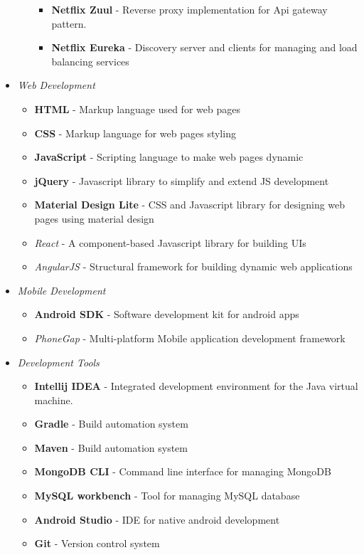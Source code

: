 \documentclass[12pt]{article}
\begin{document}
\begin{itemize}[leftmargin=20pt]
\begin{itemize}[leftmargin=20pt]
		\begin{itemize}
			\item \textbf{Netflix Zuul} - Reverse proxy implementation for Api gateway pattern.
			\item \textbf{Netflix Eureka} - Discovery server and clients for managing and load balancing services
		\end{itemize}
	\end{itemize}
	\item \textit{Web Development}
	\begin{itemize}
		\item \textbf{HTML} - Markup language used for web pages
		\item \textbf{CSS} - Markup language for web pages styling
		\item \textbf{JavaScript} - Scripting language to make web pages dynamic
		\item \textbf{jQuery} - Javascript library to simplify and extend JS development
		\item \textbf{Material Design Lite} - CSS and Javascript library for designing web pages using material design
		\item \textit{React} - A component-based Javascript library for building UIs
		\item \textit{AngularJS} - Structural framework for building dynamic web applications
		
	\end{itemize}

	\item \textit{Mobile Development}
	\begin{itemize}
		\item \textbf{Android SDK} - Software development kit for android apps
		\item \textit{PhoneGap} - Multi-platform Mobile application development framework
	\end{itemize}
	\item \textit{Development Tools}
	\begin{itemize}
		\item \textbf{Intellij IDEA} - Integrated development environment for the Java virtual machine.
		\item \textbf{Gradle} - Build automation system
		\item \textbf{Maven} - Build automation system
		\item \textbf{MongoDB CLI} - Command line interface for managing MongoDB 
		\item \textbf{MySQL workbench} - Tool for managing MySQL database
		\item \textbf{Android Studio} - IDE for native android development
		\item \textbf{Git} - Version control system
	\end{itemize}
	
	
	
	 
\end{itemize}
\end{document}

